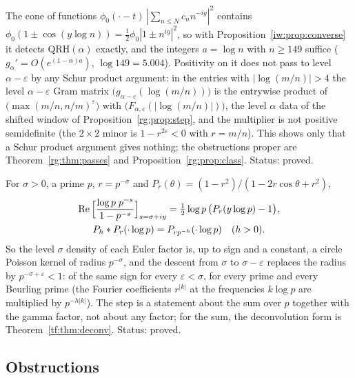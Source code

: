 \begin{remark}\label{rg:rem:hecke}
The cone of functions $\phi_0(\cdot-t)\,|\sum_{n\le N}c_nn^{-iy}|^2$ contains $\phi_0(1\pm\cos(y\log n))=\frac12\phi_0|1\pm n^{iy}|^2$, so with Proposition~\ref{iw:prop:converse} it detects $\mathrm{QRH}(\alpha)$ exactly, and the integers $a=\log n$ with $n\ge149$ suffice ($g_\alpha'=O(e^{(1-\alpha)a})$, $\log149=5.004$). Positivity on it does not pass to level $\alpha-\varepsilon$ by any Schur product argument: in the entries with $|\log(m/n)|>4$ the level $\alpha-\varepsilon$ Gram matrix $\big(g_{\alpha-\varepsilon}(\log(m/n))\big)$ is the entrywise product of $\big(\max(m/n,n/m)^\varepsilon\big)$ with $\big(F_{\alpha,\varepsilon}(|\log(m/n)|)\big)$, the level $\alpha$ data of the shifted window of Proposition~\ref{rg:prop:step}, and the multiplier is not positive semidefinite (the $2\times2$ minor is $1-r^{2\varepsilon}<0$ with $r=m/n$). This shows only that a Schur product argument gives nothing; the obstructions proper are Theorem~\ref{rg:thm:passes} and Proposition~\ref{rg:prop:class}. Status: proved.
\end{remark}

\begin{remark}\label{rg:rem:local}
For $\sigma>0$, a prime $p$, $r=p^{-\sigma}$ and $P_r(\theta)=(1-r^2)/(1-2r\cos\theta+r^2)$,
\begin{gather*}\operatorname{Re}\Big[\frac{\log p\;p^{-s}}{1-p^{-s}}\Big]_{s=\sigma+iy}=\tfrac12\log p\,\big(P_r(y\log p)-1\big),\\ P_h*P_r(\cdot\log p)=P_{rp^{-h}}(\cdot\log p)\quad(h>0).\end{gather*}
So the level $\sigma$ density of each Euler factor is, up to sign and a constant, a circle Poisson kernel of radius $p^{-\sigma}$, and the descent from $\sigma$ to $\sigma-\varepsilon$ replaces the radius by $p^{-\sigma+\varepsilon}<1$: of the same sign for every $\varepsilon<\sigma$, for every prime and every Beurling prime (the Fourier coefficients $r^{|k|}$ at the frequencies $k\log p$ are multiplied by $p^{-h|k|}$). The step is a statement about the sum over $p$ together with the gamma factor, not about any factor; for the sum, the deconvolution form is Theorem~\ref{tf:thm:deconv}. Status: proved.
\end{remark}

\subsection*{Obstructions}


